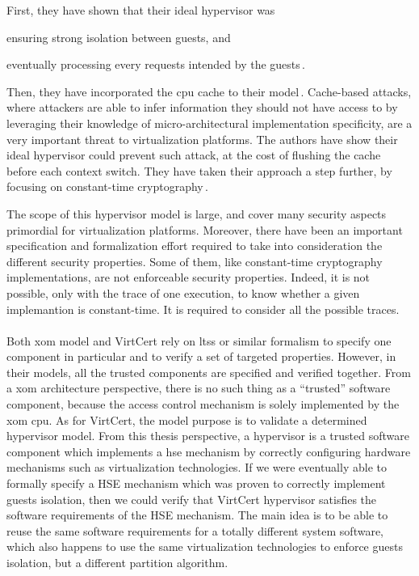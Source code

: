 First, they have shown that their ideal hypervisor was
%
\begin{inparaenum}[(1)]
\item ensuring strong isolation between guests, and
%
\item eventually processing every requests intended by the
  guests\,\cite{barthe2011virtcert1}.
\end{inparaenum}
%
Then, they have incorporated the \ac{cpu} cache to their
model\,\cite{barthe2012virtcert2}.
%
Cache-based attacks, where attackers are able to infer information they should
not have access to by leveraging their knowledge of micro-architectural
implementation specificity, are a very important threat to virtualization
platforms.
%
The authors have show their ideal hypervisor could prevent such attack, at the
cost of flushing the cache before each context switch.
%
They have taken their approach a step further, by focusing on constant-time
cryptography\,\cite{barthe2014virtcert3}.

The scope of this hypervisor model is large, and cover many security aspects
primordial for virtualization platforms.
%
Moreover, there have been an important specification and formalization effort
required to take into consideration the different security properties.
%
Some of them, like constant-time cryptography implementations, are not
enforceable security properties.
%
Indeed, it is not possible, only with the trace of one execution, to know
whether a given implemantion is constant-time.
%
It is required to consider all the possible traces.

\paragraph{}
%
Both \ac{xom} model and VirtCert rely on \acp{lts} or similar formalism to
specify one component in particular and to verify a set of targeted properties.
%
However, in their models, all the trusted components are specified and verified
together.
%
From a \ac{xom} architecture perspective, there is no such thing as a
``trusted'' software component, because the access control mechanism is solely
implemented by the \ac{xom} \ac{cpu}.
%
As for VirtCert, the model purpose is to validate a determined hypervisor model.
%
From this thesis perspective, a hypervisor is a trusted software component which
implements a \ac{hse} mechanism by correctly configuring hardware mechanisms
such as virtualization technologies.
%
If we were eventually able to formally specify a HSE mechanism which was proven
to correctly implement guests isolation, then we could verify that VirtCert
hypervisor satisfies the software requirements of the HSE mechanism.
%
The main idea is to be able to reuse the same software requirements for a
totally different system software, which also happens to use the same
virtualization technologies to enforce guests isolation, but a different
partition algorithm.

